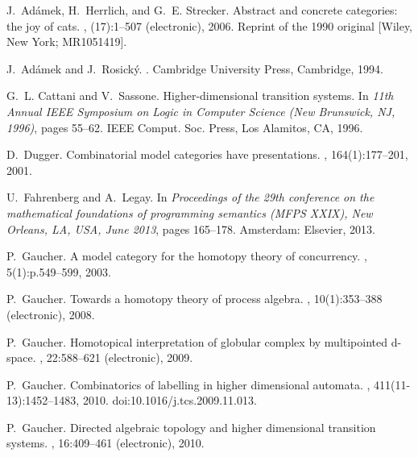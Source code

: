 \documentclass[a4paper,12pt]{amsart}
\begin{document}
\begin{thebibliography}{10}

J.~Ad{\'a}mek, H.~Herrlich, and G.~E. Strecker.
\newblock Abstract and concrete categories: the joy of cats.
, (17):1--507 (electronic), 2006.
\newblock Reprint of the 1990 original [Wiley, New York; MR1051419].

J.~Ad{\'a}mek and J.~Rosick{\'y}.
.
\newblock Cambridge University Press, Cambridge, 1994.

G.~L. Cattani and V.~Sassone.
\newblock Higher-dimensional transition systems.
\newblock In {\em 11th Annual IEEE Symposium on Logic in Computer Science (New
  Brunswick, NJ, 1996)}, pages 55--62. IEEE Comput. Soc. Press, Los Alamitos,
  CA, 1996.

D.~Dugger.
\newblock Combinatorial model categories have presentations.
, 164(1):177--201, 2001.

U.~Fahrenberg and A.~Legay.
\newblock In {\em {Proceedings of the 29th conference on the mathematical
  foundations of programming semantics (MFPS XXIX), New Orleans, LA, USA, June
  2013}}, pages 165--178. Amsterdam: Elsevier, 2013.

P.~Gaucher.
\newblock A model category for the homotopy theory of concurrency.
, 5(1):p.549--599, 2003.

P.~Gaucher.
\newblock Towards a homotopy theory of process algebra.
, 10(1):353--388 (electronic), 2008.

P.~Gaucher.
\newblock Homotopical interpretation of globular complex by multipointed
  d-space.
, 22:588--621 (electronic), 2009.

P.~Gaucher.
\newblock Combinatorics of labelling in higher dimensional automata.
, 411(11-13):1452--1483, 2010.
\newblock doi:10.1016/j.tcs.2009.11.013.

P.~Gaucher.
\newblock Directed algebraic topology and higher dimensional transition
  systems.
, 16:409--461 (electronic), 2010.


\end{thebibliography}
\end{document}
